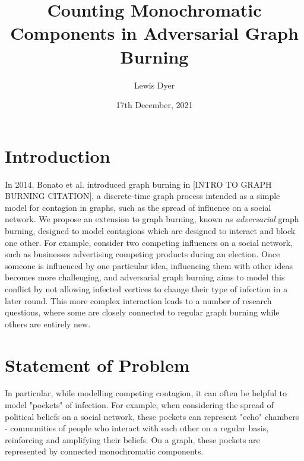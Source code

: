 \documentclass{mprop}
\begin{document}
\title{Counting Monochromatic Components in Adversarial Graph Burning}
\author{Lewis Dyer}
\date{17th December, 2021}
\maketitle

\tableofcontents
\newpage

\section{Introduction}\label{intro}

In 2014, Bonato et al. introduced graph burning in [INTRO TO GRAPH BURNING CITATION], a discrete-time graph process intended as a simple model for contagion in graphs, such as the spread of influence on a social network. We propose an extension to graph burning, known as \emph{adversarial} graph burning, designed to model contagions which are designed to interact and block one other. For example, consider two competing influences on a social network, such as businesses advertising competing products during an election. Once someone is influenced by one particular idea, influencing them with other ideas becomes more challenging, and adversarial graph burning aims to model this conflict by not allowing infected vertices to change their type of infection in a later round. This more complex interaction leads to a number of research questions, where some are closely connected to regular graph burning while others are entirely new.

\section{Statement of Problem}

In particular, while modelling competing contagion, it can often be helpful to model "pockets" of infection. For example, when considering the spread of political beliefs on a social network, these pockets can represent "echo" chambers - communities of people who interact with each other on a regular basis, reinforcing and amplifying their beliefs. On a graph, these pockets are represented by connected monochromatic components.
\end{document}
